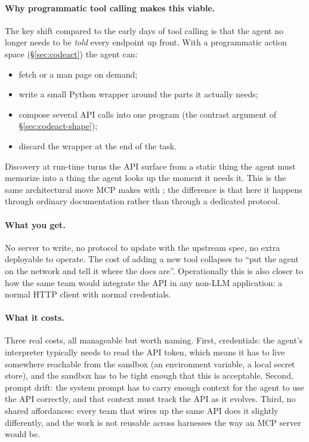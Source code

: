 \paragraph{Why programmatic tool calling makes this viable.}
The key shift compared to the early days of tool calling is that
the agent no longer needs to be \emph{told} every endpoint up
front. With a programmatic action space (\S\ref{sec:codeact}) the
agent can:

\begin{itemize}[leftmargin=1.5em,itemsep=0.2em]
\item fetch  or a man page on demand;
\item write a small Python wrapper around the parts it actually
  needs;
\item compose several API calls into one program (the contrast
  argument of \S\ref{sec:codeact-shape});
\item discard the wrapper at the end of the task.
\end{itemize}

Discovery at run-time turns the API surface from a static thing the
agent must memorize into a thing the agent looks up the moment it
needs it. This is the same architectural move MCP makes with
; the difference is that here it happens through
ordinary documentation rather than through a dedicated protocol.

\paragraph{What you get.}
No server to write, no protocol to update with the upstream spec,
no extra deployable to operate. The cost of adding a new tool
collapses to ``put the agent on the network and tell it where the
docs are''. Operationally this is also closer to how the same
team would integrate the API in any non-LLM application: a normal
HTTP client with normal credentials.

\paragraph{What it costs.}
Three real costs, all manageable but worth naming. First,
credentials: the agent's interpreter typically needs to read the
API token, which means it has to live somewhere reachable from the
sandbox (an environment variable, a local secret store), and the
sandbox has to be tight enough that this is acceptable. Second,
prompt drift: the system prompt has to carry enough context for
the agent to use the API correctly, and that context must track
the API as it evolves. Third, no shared affordances: every team
that wires up the same API does it slightly differently, and the
work is not reusable across harnesses the way an MCP server
would be.

